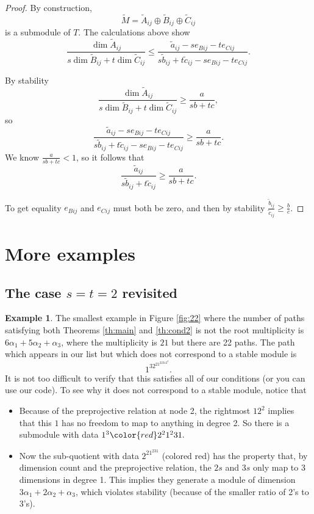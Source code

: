 \documentclass{amsart}
\numberwithin{equation}{section}
\numberwithin{figure}{section}
\numberwithin{table}{section}
\theoremstyle{definition}
\newtheorem{Example}[equation]{Example}
\begin{document}
\begin{proof}
By construction, 
$$\tilde M= \tilde A_{ij} \oplus \tilde B_{ij} \oplus \tilde C_{ij}$$
is a submodule of $T$. The calculations above show
\begin{equation} \label{eq:nd}
\frac{\dim \tilde A_{ij}}{s \dim \tilde B_{ij}+t \dim \tilde C_{ij}} \leq  \frac{\tilde a_{ij} - se_{Bij} - te_{Cij}}{s\tilde b_{ij} +t\tilde c_{ij}  -s e_{Bij} - te_{Cij}}. 
\end{equation}

By stability
\begin{equation} 
\frac{\dim \tilde A_{ij}}{s \dim \tilde B_{ij}+t \dim \tilde C_{ij}} \geq \frac{a}{sb+tc},
\end{equation}
so
\begin{equation} 
\frac{\tilde a_{ij} - se_{Bij} - te_{Cij}}{s\tilde b_{ij} +t\tilde c_{ij}  -s e_{Bij} - te_{Cij}} \geq \frac{a}{sb+tc}.
\end{equation}
We know $\frac{a}{sb+tc}<1$, so it follows that 
$$
\frac{\tilde a_{ij} }{s\tilde b_{ij} +t\tilde c_{ij}  } \geq \frac{a}{sb+tc}.
$$

To get equality $e_{Bij}$ and $e_{Cij}$ must both be zero, and then by stability $\frac{\tilde b_{ij}}{\tilde c_{ij}} \geq \frac{b}{c}$.
\end{proof}

\section{More examples}

\subsection{The case $s=t=2$ revisited}


\begin{Example}
The smallest example in Figure \ref{fig:22} where the number of paths satisfying both Theorems \ref{th:main} and \ref{th:cond2} is not the root multiplicity is $6 \alpha_1+5 \alpha_2+\alpha_3$, where the multiplicity is $21$ but there are 22 paths. The path which appears in our list but which does not correspond to a stable module is 
$$1^32^21^22312^2.$$
It is not too difficult to verify that this satisfies all of our conditions (or you can use our code). To see why it does not correspond to a stable module, notice that
\begin{itemize}
	\item Because of the preprojective relation at node 2, the rightmost $12^2$ implies that this $1$ has no freedom to map to anything in degree 2. So there is a submodule with data $1^3{\color{red} 2^21^231}.$
	
	\item Now the sub-quotient with data $ 2^21^231$ (colored red) has the property that, by dimension count and the preprojective relation, the $2s$ and $3s$ only map to 3 dimensions in degree 1. This implies they generate a module of dimension $3\alpha_1+2\alpha_2+\alpha_3$, which violates stability (because of the smaller ratio of 2's to 3's). 

\end{itemize}
\end{Example}
\end{document}
